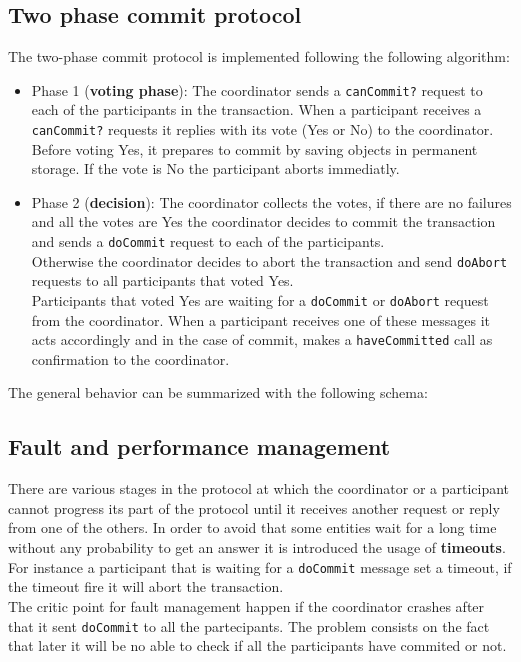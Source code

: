 \subsection{Two phase commit protocol}
The two-phase commit protocol is implemented following the following algorithm:
\begin{itemize}
	\item Phase 1 (\textbf{voting phase}): The coordinator sends a \verb|canCommit?| request to each of the participants in the transaction. When a participant receives a \verb|canCommit?| requests it replies with its vote (Yes or No) to the coordinator. Before voting Yes, it prepares to commit by saving objects in permanent storage. If the vote is No the participant aborts immediatly.
	\item Phase 2 (\textbf{decision}): The coordinator collects the votes, if there are no failures and all the votes are Yes the coordinator decides to commit the transaction and sends a \verb|doCommit| request to each of the participants.\\ Otherwise the coordinator decides to abort the transaction and send \verb|doAbort| requests to all participants that voted Yes.\\
	Participants that voted Yes are waiting for a \verb|doCommit| or \verb|doAbort| request from the coordinator. When a participant receives one of these messages it acts accordingly and in the case of commit, makes a \verb|haveCommitted| call as confirmation to the coordinator.
\end{itemize}


The general behavior can be summarized with the following schema:


\subsection{Fault and performance management}
There are various stages in the protocol at which the coordinator or a participant cannot progress its part of the protocol until it receives another request or reply from one of the others. In order to avoid that some entities wait for a long time without any probability to get an answer it is introduced the usage of \textbf{timeouts}. For instance a participant that is waiting for a \verb|doCommit| message set a timeout, if the timeout fire it will abort the transaction.\\
The critic point for fault management happen if the coordinator crashes after that it sent \verb|doCommit| to all the partecipants. The problem consists on the fact that later it will be no able to check if all the participants have commited or not.\\


